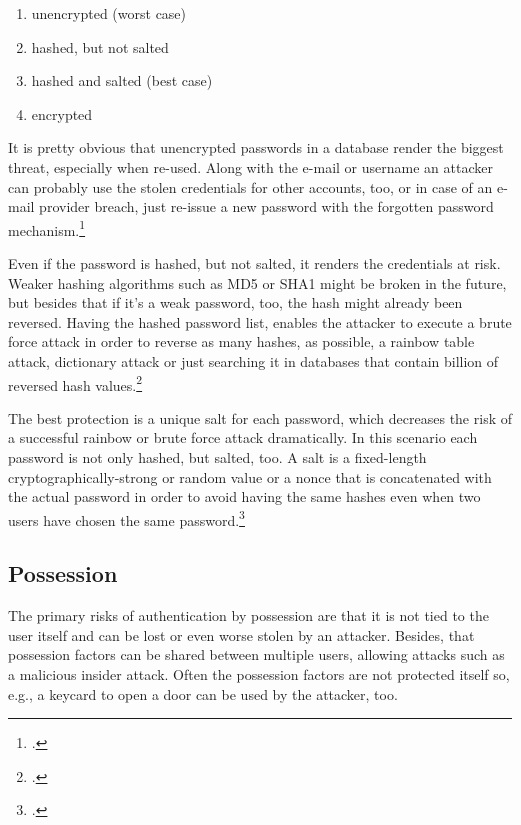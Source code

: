 \begin{enumerate}[label=(\alph*)]
	\item unencrypted (worst case)
	\item hashed, but not salted
	\item hashed and salted (best case)
	\item encrypted
\end{enumerate}

It is pretty obvious that unencrypted passwords in a database render the biggest threat, especially when re-used. Along with the e-mail or username an attacker can probably use the stolen credentials for other accounts, too, or in case of an e-mail provider breach, just re-issue a new password with the \frqq forgotten password\flqq{} mechanism.\footcite[See][277]{shostack2014threat}

Even if the password is hashed, but not salted, it renders the credentials at risk. Weaker hashing algorithms such as MD5 or SHA1 might be broken in the future, but besides that if it's a weak password, too, the hash might already been reversed. Having the hashed password list, enables the attacker to execute a brute force attack in order to reverse as many hashes, as possible, a rainbow table attack, dictionary attack or just searching it in databases that contain billion of reversed hash values.\footcites[See][1425]{Thomas:2017:DBP:3133956.3134067}[See][427--430]{320284}[See][56--57]{anderson2008security}

The best protection is a unique salt for each password, which decreases the risk of a successful rainbow or brute force attack dramatically. In this scenario each password is not only hashed, but salted, too. A salt is a fixed-length cryptographically-strong or random value or a \gls{nonce} that is concatenated with the actual password in order to avoid having the same hashes even when two users have chosen the same password.\footcites[See][32--34]{IdentityandDataSecurityforWebDevelopment}[See][130--131]{brotherston2017defensive}

	
\subsection{Possession}
\label{subsec:possession-threat}

The primary risks of authentication by possession are that it is not tied to the user itself and can be lost or even worse stolen by an attacker. Besides, that possession factors can be shared between multiple users, allowing attacks such as a malicious insider attack. Often the possession factors are not protected itself so, e.g., a keycard to open a door can be used by the attacker, too.

